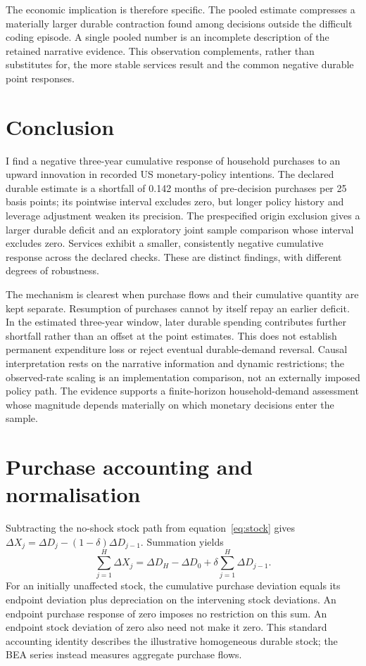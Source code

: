 \documentclass[11pt,a4paper]{article}
\begin{document}
The economic implication is therefore specific. The pooled estimate compresses a materially larger durable contraction found among decisions outside the difficult coding episode. A single pooled number is an incomplete description of the retained narrative evidence. This observation complements, rather than substitutes for, the more stable services result and the common negative durable point responses.

\section{Conclusion}

I find a negative three-year cumulative response of household purchases to an upward innovation in recorded US monetary-policy intentions. The declared durable estimate is a shortfall of 0.142 months of pre-decision purchases per 25 basis points; its pointwise interval excludes zero, but longer policy history and leverage adjustment weaken its precision. The prespecified origin exclusion gives a larger durable deficit and an exploratory joint sample comparison whose interval excludes zero. Services exhibit a smaller, consistently negative cumulative response across the declared checks. These are distinct findings, with different degrees of robustness.

The mechanism is clearest when purchase flows and their cumulative quantity are kept separate. Resumption of purchases cannot by itself repay an earlier deficit. In the estimated three-year window, later durable spending contributes further shortfall rather than an offset at the point estimates. This does not establish permanent expenditure loss or reject eventual durable-demand reversal. Causal interpretation rests on the narrative information and dynamic restrictions; the observed-rate scaling is an implementation comparison, not an externally imposed policy path. The evidence supports a finite-horizon household-demand assessment whose magnitude depends materially on which monetary decisions enter the sample.

\clearpage
\appendix
\section{Purchase accounting and normalisation}
\label{app:accounting}

Subtracting the no-shock stock path from equation~\eqref{eq:stock} gives $\Delta X_j=\Delta D_j-(1-\delta)\Delta D_{j-1}$. Summation yields
\begin{equation}
 \sum_{j=1}^{H}\Delta X_j=\Delta D_H-\Delta D_0+\delta\sum_{j=1}^{H}\Delta D_{j-1}.\label{eq:accounting}
\end{equation}
For an initially unaffected stock, the cumulative purchase deviation equals its endpoint deviation plus depreciation on the intervening stock deviations. An endpoint purchase response of zero imposes no restriction on this sum. An endpoint stock deviation of zero also need not make it zero. This standard accounting identity describes the illustrative homogeneous durable stock; the BEA series instead measures aggregate purchase flows.
\end{document}
